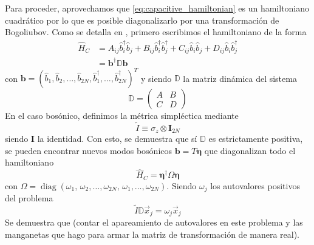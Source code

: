 Para proceder, aprovechamos que \eqref{eq:capacitive_hamiltonian} es un hamiltoniano cuadrático por lo que es posible diagonalizarlo por una transformación de Bogoliubov. Como se detalla en \cite{vanHemmen1980}, primero escribimos el hamiltoniano de la forma
\begin{align}
    \hat H_C &= A_{ij}\hat b^\dag_i \hat b_j + B_{ij}\hat b^\dag_i \hat b^\dag_j + C_{ij}\hat b_i \hat b_j + D_{ij}\hat b_i \hat b^\dag_j\\
    &= \mathbf b^\dag \mathbb D \mathbf b
\end{align}
con $\mathbf b = (\hat b_1, \hat b_2, \ldots, \hat b_{2N}, \hat b^\dag_1, \ldots, \hat b^\dag_{2N})^T$ y siendo $\mathbb D$ la matriz dinámica del sistema
\begin{equation}
    \mathbb{D} = \begin{pmatrix}
        A&B\\
        C&D
    \end{pmatrix}
\end{equation}
En el caso bosónico, definimos la métrica simpléctica mediante
\begin{equation}
    \tilde I \equiv \sigma_z \otimes \mathbf I_{2N}
\end{equation}
siendo $\mathbf I$ la identidad. Con esto, se demuestra que sí $\mathbb D$ es estrictamente positiva, se pueden encontrar nuevos modos bosónicos $\mathbf b = T \mathbf \eta$ que diagonalizan todo el hamiltoniano 
\begin{equation}
    \hat H_C = \mathbf \eta^\dag \Omega \mathbf\eta
\end{equation}
con $\Omega = \operatorname{diag}(\omega_1, \, \omega_2, \ldots, \omega_{2N}, \,\omega_1, \ldots, \omega_{2N})$. Siendo $\omega_j$ los autovalores positivos del problema 
\begin{equation}
    \tilde I \mathbb D \vec x_j = \omega_j \vec x_j
\end{equation}
Se demuestra que (contar el apareamiento de autovalores en este problema y las manganetas que hago para armar la matriz de transformación de manera real).